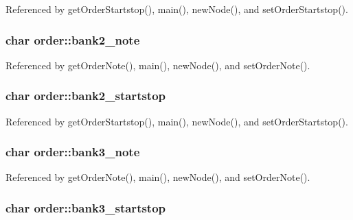Referenced by get\-Order\-Startstop(), main(), new\-Node(), and set\-Order\-Startstop().

\hypertarget{structorder_adc801e65b34bd19e8db0decc145bc791}{
\subsubsection[{bank2\-\_\-note}]{\setlength{\rightskip}{0pt plus 5cm}char order\-::bank2\-\_\-note}}\label{structorder_adc801e65b34bd19e8db0decc145bc791}


Referenced by get\-Order\-Note(), main(), new\-Node(), and set\-Order\-Note().

\hypertarget{structorder_aa07172101a0760b7b19335fe24f9e462}{
\subsubsection[{bank2\-\_\-startstop}]{\setlength{\rightskip}{0pt plus 5cm}char order\-::bank2\-\_\-startstop}}\label{structorder_aa07172101a0760b7b19335fe24f9e462}


Referenced by get\-Order\-Startstop(), main(), new\-Node(), and set\-Order\-Startstop().

\hypertarget{structorder_aed04b397690a0528443e701f41a99e8f}{
\subsubsection[{bank3\-\_\-note}]{\setlength{\rightskip}{0pt plus 5cm}char order\-::bank3\-\_\-note}}\label{structorder_aed04b397690a0528443e701f41a99e8f}


Referenced by get\-Order\-Note(), main(), new\-Node(), and set\-Order\-Note().

\hypertarget{structorder_a92057c9ceb6ae7cc28814e5a8b3ff3e2}{
\subsubsection[{bank3\-\_\-startstop}]{\setlength{\rightskip}{0pt plus 5cm}char order\-::bank3\-\_\-startstop}}\label{structorder_a92057c9ceb6ae7cc28814e5a8b3ff3e2}


